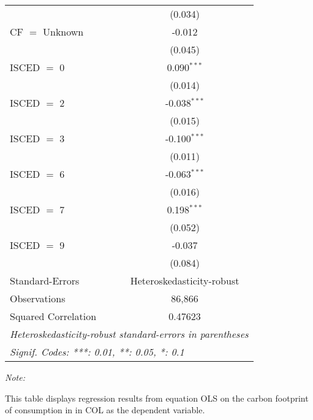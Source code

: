 \begin{table}[htbp!]
\begin{adjustbox}{width = 1\textwidth, max height = 0.95\textheight, center}
\begin{threeparttable}[b]
\begin{tabular}{lc}
                                & (0.034)\\   
            CF $=$ Unknown      & -0.012\\   
                                & (0.045)\\   
            ISCED $=$ 0         & 0.090$^{***}$\\   
                                & (0.014)\\   
            ISCED $=$ 2         & -0.038$^{***}$\\   
                                & (0.015)\\   
            ISCED $=$ 3         & -0.100$^{***}$\\   
                                & (0.011)\\   
            ISCED $=$ 6         & -0.063$^{***}$\\   
                                & (0.016)\\   
            ISCED $=$ 7         & 0.198$^{***}$\\   
                                & (0.052)\\   
            ISCED $=$ 9         & -0.037\\   
                                & (0.084)\\   
            \midrule 
            Standard-Errors     & Heteroskedasticity-robust \\   
            Observations        & 86,866\\  
            Squared Correlation & 0.47623\\  
            \midrule \midrule
            \multicolumn{2}{l}{\emph{Heteroskedasticity-robust standard-errors in parentheses}}\\
            \multicolumn{2}{l}{\emph{Signif. Codes: ***: 0.01, **: 0.05, *: 0.1}}\\
         \end{tabular}
         
         \begin{tablenotes}\item \medskip \textit{Note:}
            \item This table displays regression results from equation OLS on the carbon footprint of consumption in  in COL as the dependent variable.  
         \end{tablenotes}
      \end{threeparttable}
   \end{adjustbox}
\end{table}


